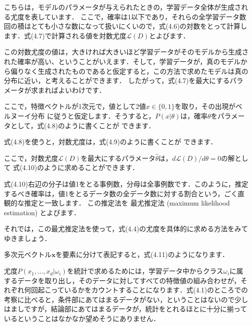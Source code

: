

こちらは，モデルのパラメータが与えられたときの，学習データ全体が生成される尤度を表しています．
ここで，確率は1以下であり，それらの全学習データ数回の積はとても小さな数になって扱いにくいので，式(4.6)の対数をとって計算します．式(4.7)で計算される値を対数尤度$\mathcal{L}(D)$とよびます．


この対数尤度の値は，大きければ大きいほど学習データがそのモデルから生成された確率が高い、ということがいえます．そして，学習データが，真のモデルから偏りなく生成されたものであると仮定すると，この方法で求めたモデルは真の分布に近い，と考えることができます．
したがって，式(4.7)を最大にするパラメータが求まればよいわけです．


ここで，特徴ベクトルが1次元で，値として2値$x \in \{0,1\}$を取り，その出現がベルヌーイ分布
に従うと仮定します．そうすると，$P(x|\theta)$は，確率$\theta$をパラメータとして，式(4.8)のように書くことが
できます．


式(4.8)を使うと，対数尤度は，式(4.9)のように書くことが
できます．



ここで，対数尤度$\mathcal{L}(D)$を最大にするパラメータ$\hat{\theta}$は，$d \mathcal{L}(D) / d\theta = 0$の解として
式(4.10)のように求めることができます．


式(4.10)右辺の分子は値1をとる事例数，分母は全事例数です．このように，推定するべき確率は，値1をとるデータ数の全データ数に対する割合という，ごく直観的な推定と一致します．
この推定法を
最尤推定法 (maximum likelihood estimation) 
とよびます．


それでは，この最尤推定法を使って，式(4.4)の尤度を具体的に求める方法をみてゆきましょう．

多次元ベクトル$\bm{x}$を要素に分けて表記すると，式(4.11)のようになります．


尤度$ P(x_{1}, \dots, x_d \vert \omega_i)$を統計で求めるためには，学習データ中からクラス$\omega_i$に属するデータを取り出し，そのデータに対してすべての特徴値の組み合わせが，それぞれ何回起こっているかをカウントすることになります．式(4.1)のところでの考察に比べると，条件部にあてはまるデータがない，ということはないので少しはましですが，結論部にあてはまるデータが，統計をとれるほとに十分に揃っているということはなかなか望めそうにありません．

